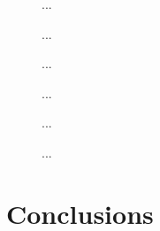 \documentclass[]{article}
\begin{document}
\begin{figure}[h]
  \begin{center}
    
  \end{center}
  \caption[...]{...}
\end{figure}

\begin{figure}[h]
  \begin{center}
    
  \end{center}
  \caption[...]{...}
\end{figure}

\begin{figure}[h]
  \begin{center}
    
  \end{center}
  \caption[...]{...}
\end{figure}

\begin{figure}[h]
  \begin{center}
    
  \end{center}
  \caption[...]{...}
\end{figure}

\begin{figure}[h]
  \begin{center}
    
  \end{center}
  \caption[...]{...}
\end{figure}

\begin{figure}[h]
  \begin{center}
    
  \end{center}
  \caption[...]{...}
\end{figure}






\section{Conclusions}
\label{sec:co}

\clearpage



\clearpage

\listoftodos
\end{document}
